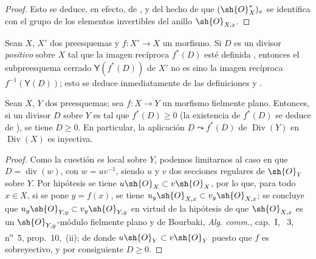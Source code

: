 \begin{proof}
Esto se deduce, en efecto, de ,  y del hecho de que $(\sh{O}_X^*)_x$ se identifica con el grupo de los elementos invertibles del anillo $\sh{O}_{X,x}$.
\end{proof}

\begin{env}[21.4.7]
\label{IV.21.4.7}
Sean $X$, $X'$ dos preesquemas y $f:X'\to X$ un morfismo.
Si $D$ es un divisor \emph{positivo} sobre $X$ tal que la imagen recíproca $f^*(D)$ esté definida , entonces el subpreesquema cerrado $\boldsymbol{\mathsf{Y}}(f^*(D))$ de $X'$ no es sino la imagen recíproca $f^{-1}(\boldsymbol{\mathsf{Y}}(D))$;
esto se deduce inmediatamente de las definiciones  y .
\end{env}

\begin{proposition}[21.4.8]
\label{IV.21.4.8}
Sean $X$, $Y$ dos preesquemas;
sea $f:X\to Y$ un morfismo fielmente plano.
Entonces, si un divisor $D$ sobre $Y$ es tal que $f^*(D)\geq0$ \textup{(la existencia de $f^*(D)$ se deduce de )}, se tiene $D\geq0$.
En particular, la aplicación $D\leadsto f^*(D)$ de $\operatorname{Div}(Y)$ en $\operatorname{Div}(X)$ es inyectiva.
\end{proposition}

\begin{proof}
Como la cuestión es local sobre $Y$, podemos limitarnos al caso en que $D=\operatorname{div}(w)$, con $w=uv^{-1}$, siendo $u$ y $v$ dos secciones regulares de $\sh{O}_Y$ sobre $Y$.
Por hipótesis se tiene $u\sh{O}_X\subset v\sh{O}_X$, por lo que, para todo $x\in X$, si se pone $y=f(x)$, se tiene $u_y\sh{O}_{X,x}\subset v_y\sh{O}_{X,x}$;
se concluye que $u_y\sh{O}_{Y,y}\subset v_y\sh{O}_{Y,y}$ en virtud de la hipótesis de que $\sh{O}_{X,x}$ es un $\sh{O}_{Y,y}$-módulo fielmente plano y de Bourbaki, \emph{Alg. comm.}, cap.~I, \textsection~3, n\textsuperscript{o}~5, prop.~10,~(ii);
de donde $u\sh{O}_Y\subset v\sh{O}_Y$ puesto que $f$ es sobreyectivo, y por consiguiente $D\geq0$.
\end{proof}


